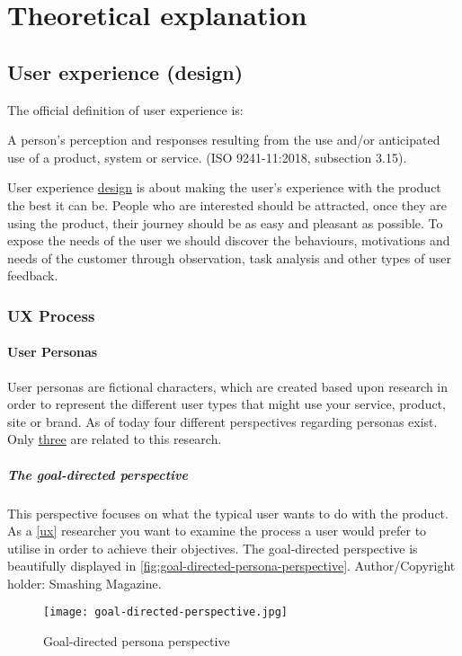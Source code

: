 \chapter{Theoretical explanation}

\section{User experience (design)}
The official definition of user experience is: 
\begin{displayquote}
    A person's perception and responses resulting from the use and/or anticipated use of a product, system or service. (ISO 9241-11:2018, subsection 3.15).
\end{displayquote}

User experience \underline{design} is about making the user's experience with the product the best it can be. People who are interested should be attracted, once they are using the product, their journey should be as easy and pleasant as possible. To expose the needs of the user we should discover the behaviours, motivations and needs of the customer through observation, task analysis and other types of user feedback.

\subsection{UX Process}
    \subsubsection{User Personas}
    User personas are fictional characters, which are created based upon research in order to represent the different user types that might use your service, product, site or brand. As of today four different perspectives regarding personas exist. Only \underline{three} are related to this research.
    
    \paragraph{The goal-directed perspective}
        This perspective focuses on what the typical user wants to do with the product. As a \autoref{ux} researcher you want to examine the process a user would prefer to utilise in order to achieve their objectives. The goal-directed perspective is beautifully displayed in \autoref{fig:goal-directed-persona-perspective}. Author/Copyright holder: Smashing Magazine.
        \begin{figure}
            \centering
            \texttt{[image: goal-directed-perspective.jpg]}
            \caption{Goal-directed persona perspective}
            \label{fig:goal-directed-persona-perspective}
        \end{figure}
